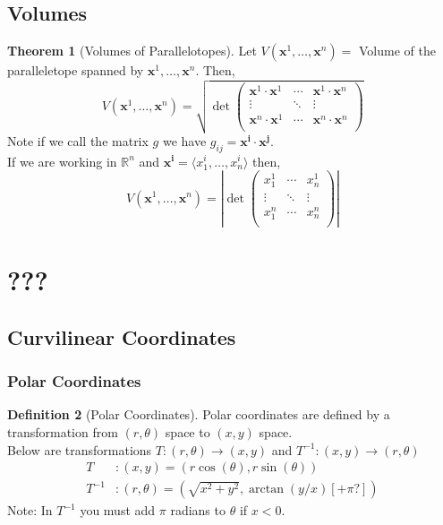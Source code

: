 \documentclass[11pt]{article}
\theoremstyle{definition}
\newtheorem{theorem}{Theorem}[section]
\newtheorem{definition}[theorem]{Definition}
\begin{document}
\subsection{Volumes}
\begin{theorem}[Volumes of Parallelotopes]
Let $V(\mathbf{x}^1,\dots,\mathbf{x}^n) = $ Volume of the paralleletope
spanned by $\mathbf{x}^1,\dots,\mathbf{x}^n$.
Then,
$$V(\mathbf{x}^1,\dots,\mathbf{x}^n) = \sqrt{\det
\begin{pmatrix}
    \mathbf{x}^1 \cdot \mathbf{x}^1 & \cdots & \mathbf{x}^1 \cdot
    \mathbf{x}^n \\
    \vdots & \ddots & \vdots \\
    \mathbf{x}^n \cdot \mathbf{x}^1 & \cdots & \mathbf{x}^n \cdot
    \mathbf{x}^n \\
\end{pmatrix}}
$$
Note if we call the matrix $g$ we have $g_{ij} = \mathbf{x^i} \cdot
\mathbf{x^j}$.\\
If we are working in $\mathbb{R}^n$ and $\mathbf{x^i} = \langle x^i_1,
\dots, x^i_n \rangle$ then,
$$V(\mathbf{x}^1,\dots,\mathbf{x}^n) = \left\vert\det
\begin{pmatrix}
    x_1^1  & \cdots & x_n^1 \\
    \vdots & \ddots & \vdots \\
    x_1^n  & \cdots & x_n^n \\


\end{pmatrix}\right\vert
$$

\end{theorem}
\section{???}
\subsection{Curvilinear Coordinates}
\subsubsection{Polar Coordinates}
\begin{definition}[Polar Coordinates]
Polar coordinates are defined by a transformation from $(r, \theta)$ space
to $(x,y)$ space. \\
Below are transformations $T: (r, \theta) \to (x,y)$ and $T^{-1}: (x,y) \to
(r,\theta)$
\begin{align*}
    T&: (x,y) = (r\cos(\theta),r\sin(\theta)) \\
    T^{-1}&: (r,\theta) = (\sqrt{x^2+y^2},\arctan(y/x)[+\pi?])
\end{align*}
Note: In $T^{-1}$ you must add $\pi$ radians to $\theta$ if $x<0$. 

\end{definition}
\end{document}
